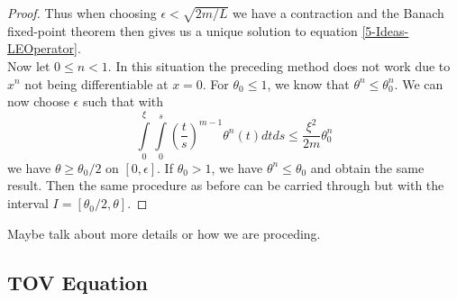 \begin{proof}
	Thus when choosing $\epsilon<\sqrt{2m/L}$ we have a contraction and the Banach fixed-point theorem then gives us a unique solution to equation \ref{5-Ideas-LEOperator}.\\
	Now let $0\leq n<1$.
	In this situation the preceding method does not work due to $x^n$ not being differentiable at $x=0$. 
	For $\theta_0\leq1$, we know that $\theta^n\leq\theta_0^n$. We can now choose $\epsilon$ such that with
	\begin{equation}
		\int\limits_0^\xi\int\limits_0^s\left(\frac{t}{s}\right)^{m-1}\theta^n(t)dtds \leq \frac{\xi^2}{2m}\theta_0^n
	\end{equation}
	we have $\theta\geq\theta_0/2$ on $[0,\epsilon]$. If $\theta_0>1$, we have $\theta^n\leq\theta_0$ and obtain the same result. 
	Then the same procedure as before can be carried through but with the interval $I=[\theta_0/2,\theta]$.
\end{proof}
Maybe talk about more details or how we are proceding.

\begin{lemma}
	
\end{lemma}

%
%
%
\subsection{TOV Equation}

%
%
%
